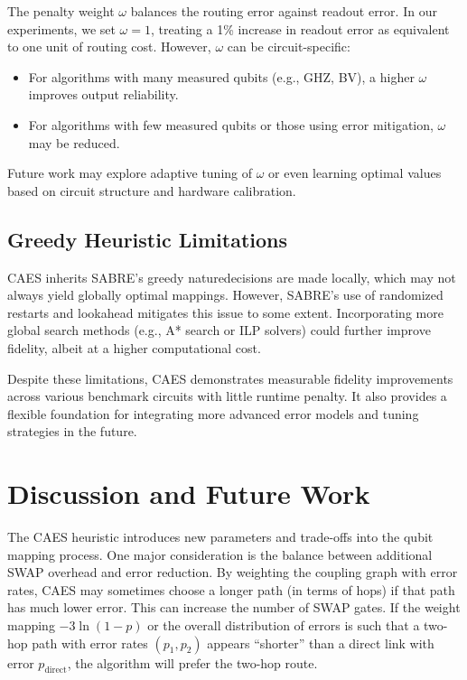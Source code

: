 \documentclass[conference]{IEEEtran}
\begin{document}
The penalty weight $\omega$ balances the routing error against readout error. In our experiments, we set $\omega = 1$, treating a 1\% increase in readout error as equivalent to one unit of routing cost. However, $\omega$ can be circuit-specific:
\begin{itemize}
    \item For algorithms with many measured qubits (e.g., GHZ, BV), a higher $\omega$ improves output reliability.
    \item For algorithms with few measured qubits or those using error mitigation, $\omega$ may be reduced.
\end{itemize}

Future work may explore adaptive tuning of $\omega$ or even learning optimal values based on circuit structure and hardware calibration.

\subsection{Greedy Heuristic Limitations}

CAES inherits SABRE’s greedy nature\textemdash decisions are made locally, which may not always yield globally optimal mappings. However, SABRE’s use of randomized restarts and lookahead mitigates this issue to some extent. Incorporating more global search methods (e.g., A* search or ILP solvers) could further improve fidelity, albeit at a higher computational cost.

Despite these limitations, CAES demonstrates measurable fidelity improvements across various benchmark circuits with little runtime penalty. It also provides a flexible foundation for integrating more advanced error models and tuning strategies in the future.


\section{Discussion and Future Work}

The CAES heuristic introduces new parameters and trade-offs into the qubit mapping process. One major consideration is the balance between additional SWAP overhead and error reduction. By weighting the coupling graph with error rates, CAES may sometimes choose a longer path (in terms of hops) if that path has much lower error. This can increase the number of SWAP gates. If the weight mapping $-3\ln(1-p)$ or the overall distribution of errors is such that a two-hop path with error rates $(p_1, p_2)$ appears ``shorter'' than a direct link with error $p_{\text{direct}}$, the algorithm will prefer the two-hop route.
\end{document}
